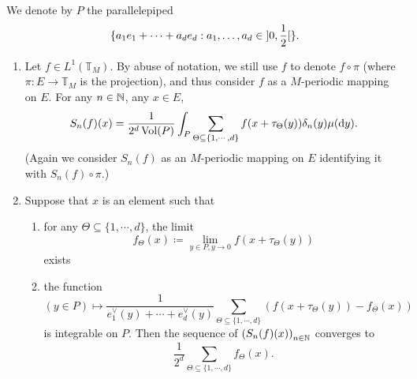 \begin{theoremenv}[Dirichlet]
    We denote by $P$ the parallelepiped
    $$\{a_1e_1 + \cdots + a_d e_d : a_1,\ldots,a_d \in \interval[open]{0}{\frac{1}{2}}\}.$$
    \begin{enumerate}[label = (\arabic*)]
        \item Let $f \in L^1(\mathbb{T}_{M})$.
            By abuse of notation, we still use $f$ to denote $f \circ \pi$ (where $\pi : E \longrightarrow \mathbb{T}_{M}$ is the projection), and thus consider $f$ as a $M$-periodic mapping on $E$.
            For any $n \in \mathbb{N}$, any $x \in E$,
            $$S_{n}(f) (x) = \frac{1}{2^d \operatorname{\mathrm{Vol}}(P)} \int_{P} \sum_{\Theta \subseteq \{1,\cdots,d\}} f(x + \tau_{\Theta}(y)) \delta_{n}(y) \mu(\mathrm{d} y).$$
            (Again we consider $S_n(f)$ as an $M$-periodic mapping on $E$ identifying it with $S_n(f) \circ \pi$.)
        \item Suppose that $x$ is an element such that
            \begin{enumerate}
                \item for any $\Theta \subseteq \{1,\cdots,d\}$, the limit
                    $$f_{\Theta}(x) \coloneq \lim_{y \in P, y \to 0} f(x + \tau_{\Theta}(y))$$
                    exists
                \item the function
                    $$(y \in P) \longmapsto \frac{1}{e_1^\vee (y) + \cdots + e_d^\vee (y)} \sum_{\Theta \subseteq \{1,\cdots,d\}} \left(f(x + \tau_{\Theta}(y)) - f_{\Theta}(x)\right)$$
                    is integrable on $P$.
                    Then the sequence of $\left(S_{n}(f)(x)\right)_{n \in \mathbb{N}}$ converges to
                    $$\frac{1}{2^d} \sum_{\Theta \subseteq \{1,\cdots,d\}} f_{\Theta}(x).$$
            \end{enumerate}
    \end{enumerate}
\end{theoremenv}
